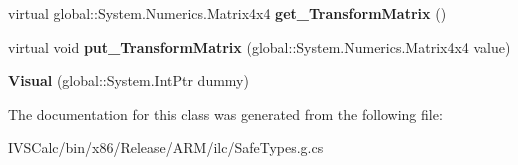 \begin{DoxyCompactItemize}
\item 
\mbox{\label{class_windows_1_1_u_i_1_1_composition_1_1_visual_a8c23adab99bc95b5ccbf93a75ed76265}} 
virtual global\+::\+System.\+Numerics.\+Matrix4x4 {\bfseries get\+\_\+\+Transform\+Matrix} ()
\item 
\mbox{\label{class_windows_1_1_u_i_1_1_composition_1_1_visual_a2689ab7c32a3c7a5d1978aa89a514762}} 
virtual void {\bfseries put\+\_\+\+Transform\+Matrix} (global\+::\+System.\+Numerics.\+Matrix4x4 value)
\item 
\mbox{\label{class_windows_1_1_u_i_1_1_composition_1_1_visual_ae752ab49085c6766890dc632d053d6e8}} 
{\bfseries Visual} (global\+::\+System.\+Int\+Ptr dummy)
\end{DoxyCompactItemize}


The documentation for this class was generated from the following file\+:\begin{DoxyCompactItemize}
\item 
I\+V\+S\+Calc/bin/x86/\+Release/\+A\+R\+M/ilc/Safe\+Types.\+g.\+cs\end{DoxyCompactItemize}
